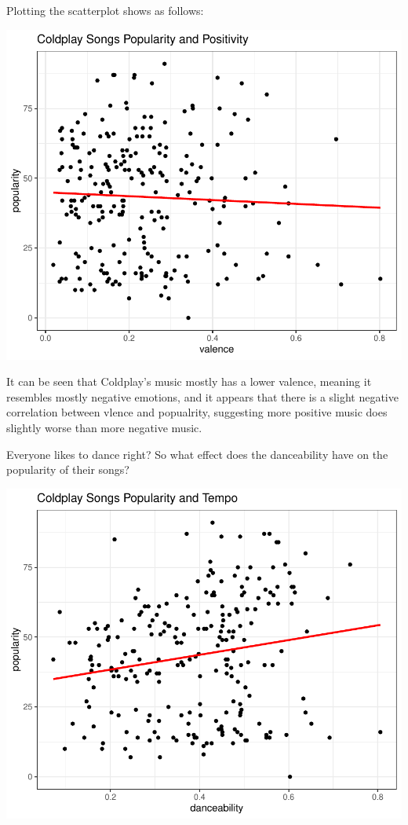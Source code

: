 \documentclass[11pt,preprint, authoryear]{elsarticle}
\numberwithin{equation}{section}
\numberwithin{figure}{section}
\numberwithin{table}{section}
\begin{document}
Plotting the scatterplot shows as follows:

\includegraphics{Question_3_files/figure-latex/unnamed-chunk-2-1.pdf}

It can be seen that Coldplay's music mostly has a lower valence, meaning
it resembles mostly negative emotions, and it appears that there is a
slight negative correlation between vlence and popualrity, suggesting
more positive music does slightly worse than more negative music.

Everyone likes to dance right? So what effect does the danceability have
on the popularity of their songs?

\includegraphics{Question_3_files/figure-latex/unnamed-chunk-3-1.pdf}
\end{document}
